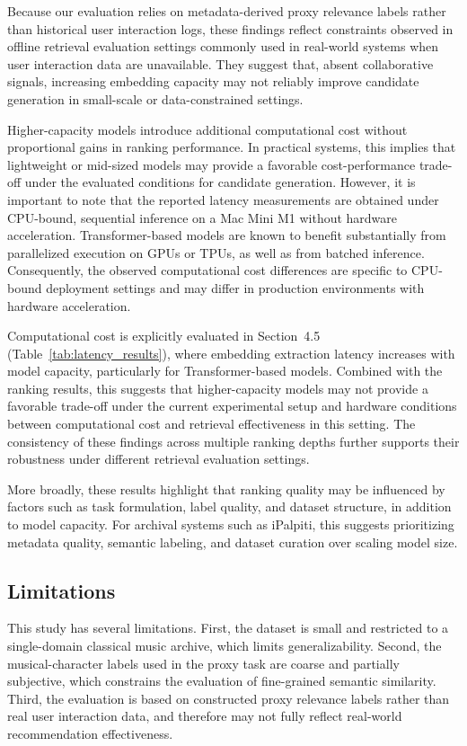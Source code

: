 \documentclass[sigconf]{acmart}
\begin{document}
Because our evaluation relies on metadata-derived proxy relevance labels rather than historical user interaction logs, these findings reflect constraints observed in offline retrieval evaluation settings commonly used in real-world systems when user interaction data are unavailable. They suggest that, absent collaborative signals, increasing embedding capacity may not reliably improve candidate generation in small-scale or data-constrained settings.

Higher-capacity models introduce additional computational cost without proportional gains in ranking performance. In practical systems, this implies that lightweight or mid-sized models may provide a favorable cost-performance trade-off under the evaluated conditions for candidate generation. However, it is important to note that the reported latency measurements are obtained under CPU-bound, sequential inference on a Mac Mini M1 without hardware acceleration. Transformer-based models are known to benefit substantially from parallelized execution on GPUs or TPUs, as well as from batched inference. Consequently, the observed computational cost differences are specific to CPU-bound deployment settings and may differ in production environments with hardware acceleration.

Computational cost is explicitly evaluated in Section~4.5 (Table~\ref{tab:latency_results}), where embedding extraction latency increases with model capacity, particularly for Transformer-based models. Combined with the ranking results, this suggests that higher-capacity models may not provide a favorable trade-off under the current experimental setup and hardware conditions between computational cost and retrieval effectiveness in this setting. The consistency of these findings across multiple ranking depths further supports their robustness under different retrieval evaluation settings.

More broadly, these results highlight that ranking quality may be influenced by factors such as task formulation, label quality, and dataset structure, in addition to model capacity. For archival systems such as iPalpiti, this suggests prioritizing metadata quality, semantic labeling, and dataset curation over scaling model size.

\subsection{Limitations}
This study has several limitations. First, the dataset is small and restricted to a single-domain classical music archive, which limits generalizability. Second, the musical-character labels used in the proxy task are coarse and partially subjective, which constrains the evaluation of fine-grained semantic similarity. Third, the evaluation is based on constructed proxy relevance labels rather than real user interaction data, and therefore may not fully reflect real-world recommendation effectiveness.
\end{document}
